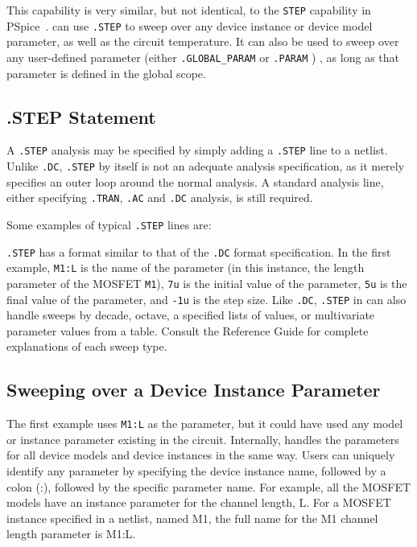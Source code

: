 This capability is very similar, but not identical, to the \verb|STEP|
capability in PSpice~\cite{PSpiceUG:1998}.  \Xyce{} can use
\verb|.STEP| to sweep over any device instance or device model
parameter, as well as the circuit temperature.    It can also be used 
to sweep over any user-defined parameter (either \texttt{.GLOBAL\_PARAM} 
or \texttt{.PARAM} ) , as long as that parameter is  defined in the 
global scope.

\subsection{.STEP Statement}

A \verb|.STEP| analysis may be specified by simply adding a
\verb|.STEP| line to a netlist.  Unlike \verb|.DC|, \verb|.STEP| by
itself is not an adequate analysis specification, as it merely
specifies an outer loop around the normal analysis.  A standard
analysis line, either specifying \verb|.TRAN|, \verb|.AC| and
\verb|.DC| analysis, is still required.

Some examples of typical \verb|.STEP| lines are:


\verb|.STEP| has a format similar to that of the \verb|.DC| format
specification.  In the first example, \verb|M1:L| is the name of the
parameter (in this instance, the length parameter of the MOSFET
\texttt{M1}), \verb|7u| is the initial value of the parameter,
\verb|5u| is the final value of the parameter, and \verb|-1u| is the
step size.  Like \verb|.DC|, \verb|.STEP| in \Xyce{} can also handle
sweeps by decade, octave, a specified lists of values, or multivariate parameter values from a table.  Consult the
\Xyce{} Reference Guide\ReferenceGuide{} for complete explanations of each sweep type.

\subsection{Sweeping over a Device Instance Parameter}
\label{step_InstanceParam}

The first example uses \verb|M1:L| as the parameter, but it could have
used any model or instance parameter existing in the
circuit. Internally, \Xyce{} handles the parameters for all device
models and device instances in the same way.  Users can uniquely
identify any parameter by specifying the device instance name,
followed by a colon (:), followed by the specific parameter name.  For
example, all the MOSFET models have an instance parameter for the
channel length, L.  For a MOSFET instance specified in a netlist,
named M1, the full name for the M1 channel length parameter is M1:L.

